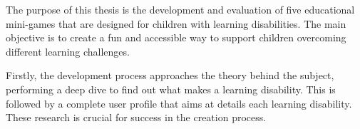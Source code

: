 



The purpose of this thesis is the development and evaluation of five educational mini-games that are designed for children with learning disabilities. The main objective is to create a fun and accessible way to support children overcoming different learning challenges.

Firstly, the development process approaches the theory behind the subject, performing a deep dive to find out what makes a learning disability. This is followed by a complete user profile that aims at details each learning disability. These research is crucial for success in the creation process.

